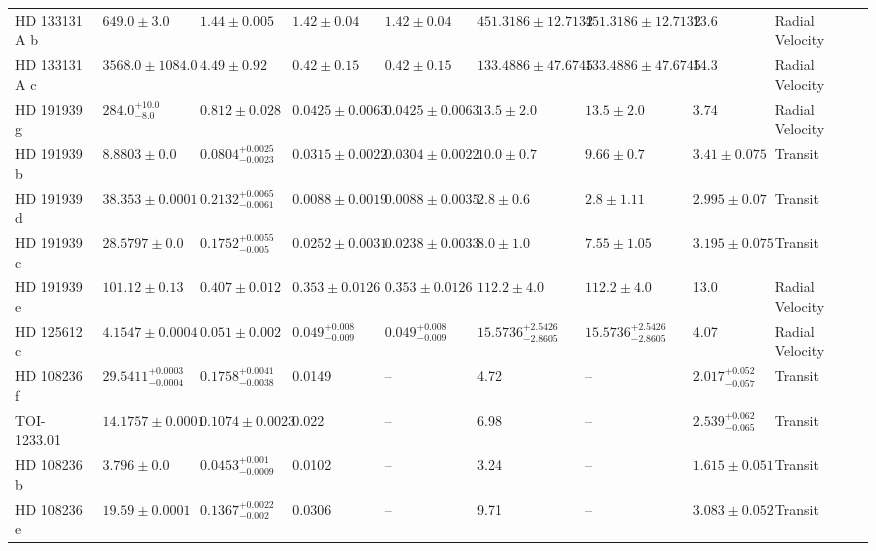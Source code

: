 \begin{tabular}{llllllllll}
HD 133131 A b & $649.0 \pm 3.0$ & $1.44 \pm 0.005$ & $1.42 \pm 0.04$ & $1.42 \pm 0.04$ & $451.3186 \pm 12.7132$ & $451.3186 \pm 12.7132$ & 13.6 & Radial Velocity & \cite{TESKE_ET_AL__2016} \\
HD 133131 A c & $3568.0 \pm 1084.0$ & $4.49 \pm 0.92$ & $0.42 \pm 0.15$ & $0.42 \pm 0.15$ & $133.4886 \pm 47.6745$ & $133.4886 \pm 47.6745$ & 14.3 & Radial Velocity & \cite{TESKE_ET_AL__2016} \\
HD 191939 g & $284.0^{+10.0}_{-8.0}$ & $0.812 \pm 0.028$ & $0.0425 \pm 0.0063$ & $0.0425 \pm 0.0063$ & $13.5 \pm 2.0$ & $13.5 \pm 2.0$ & 3.74 & Radial Velocity & \cite{ORELL_MIQUEL_ET_AL_2023} \\
HD 191939 b & $8.8803 \pm 0.0$ & $0.0804^{+0.0025}_{-0.0023}$ & $0.0315 \pm 0.0022$ & $0.0304 \pm 0.0022$ & $10.0 \pm 0.7$ & $9.66 \pm 0.7$ & $3.41 \pm 0.075$ & Transit & \cite{ORELL_MIQUEL_ET_AL_2023} \\
HD 191939 d & $38.353 \pm 0.0001$ & $0.2132^{+0.0065}_{-0.0061}$ & $0.0088 \pm 0.0019$ & $0.0088 \pm 0.0035$ & $2.8 \pm 0.6$ & $2.8 \pm 1.11$ & $2.995 \pm 0.07$ & Transit & \cite{ORELL_MIQUEL_ET_AL_2023} \\
HD 191939 c & $28.5797 \pm 0.0$ & $0.1752^{+0.0055}_{-0.005}$ & $0.0252 \pm 0.0031$ & $0.0238 \pm 0.0033$ & $8.0 \pm 1.0$ & $7.55 \pm 1.05$ & $3.195 \pm 0.075$ & Transit & \cite{ORELL_MIQUEL_ET_AL_2023} \\
HD 191939 e & $101.12 \pm 0.13$ & $0.407 \pm 0.012$ & $0.353 \pm 0.0126$ & $0.353 \pm 0.0126$ & $112.2 \pm 4.0$ & $112.2 \pm 4.0$ & 13.0 & Radial Velocity & \cite{ORELL_MIQUEL_ET_AL_2023} \\
HD 125612 c & $4.1547 \pm 0.0004$ & $0.051 \pm 0.002$ & $0.049^{+0.008}_{-0.009}$ & $0.049^{+0.008}_{-0.009}$ & $15.5736^{+2.5426}_{-2.8605}$ & $15.5736^{+2.5426}_{-2.8605}$ & 4.07 & Radial Velocity & \cite{FENG_ET_AL__2022} \\
HD 108236 f & $29.5411^{+0.0003}_{-0.0004}$ & $0.1758^{+0.0041}_{-0.0038}$ & 0.0149 & -- & 4.72 & -- & $2.017^{+0.052}_{-0.057}$ & Transit & \cite{BONFANTI_ET_AL__2021} \\
TOI-1233.01 & $14.1757 \pm 0.0001$ & $0.1074 \pm 0.0023$ & 0.022 & -- & 6.98 & -- & $2.539^{+0.062}_{-0.065}$ & Transit & \cite{BONFANTI_ET_AL__2021} \\
HD 108236 b & $3.796 \pm 0.0$ & $0.0453^{+0.001}_{-0.0009}$ & 0.0102 & -- & 3.24 & -- & $1.615 \pm 0.051$ & Transit & \cite{BONFANTI_ET_AL__2021} \\
HD 108236 e & $19.59 \pm 0.0001$ & $0.1367^{+0.0022}_{-0.002}$ & 0.0306 & -- & 9.71 & -- & $3.083 \pm 0.052$ & Transit & \cite{BONFANTI_ET_AL__2021} \\

\end{tabular}
